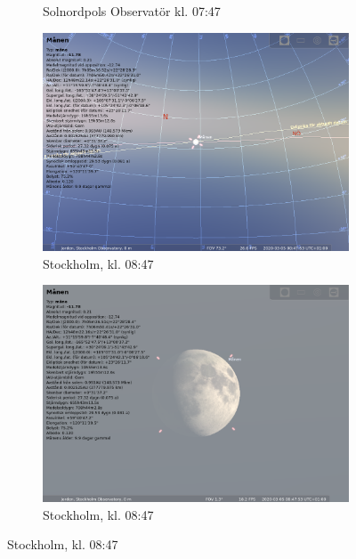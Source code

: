 \documentclass[./exercises.tex]{subfiles}
\begin{document}
\begin{itemize}
\begin{figure}[H]
\begin{subfigure}[b]{0.45\textwidth}
         \caption{Solnordpols Observatör kl. 07:47}
         \label{fig:three sin x}
     \end{subfigure}
     \hfill
     \begin{subfigure}[b]{0.45\textwidth}
         \centering
         \includegraphics[width=\textwidth]{Stellarium1/FirstQuarter/stellarium-002.png}
         \caption{Stockholm, kl. 08:47}
         \label{fig:three sin x}
     \end{subfigure}
     \hfill
     \begin{subfigure}[b]{0.45\textwidth}
         \centering
         \includegraphics[width=\textwidth]{Stellarium1/FirstQuarter/stellarium-003.png}
         \caption{Stockholm, kl. 08:47}
         \label{fig:three sin x}
     \end{subfigure}
     \hfill

\end{figure}
\end{itemize}
\end{document}

